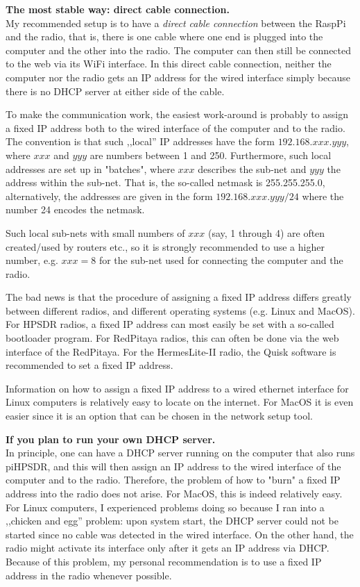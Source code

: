 \documentclass[12pt]{book}
\def\pH{pi\-HPSDR\xspace}
\begin{document}
\textbf{The most stable way: direct cable connection.}\\
My recommended setup is to have a \textit{direct cable connection} between the RaspPi and the radio, that
is, there is one cable where one end is plugged into the computer and the other into the radio. The computer
can then still be connected to the web via its WiFi interface. In this direct cable connection, neither
the computer nor the radio gets an IP address for the wired interface simply because there is no DHCP server
at either side of the cable.

To make the communication work, the easiest work-around is probably to assign a fixed IP address both to
the wired interface of the computer and to the radio. The convention is that such ,,local'' IP addresses have
the form $192.168.xxx.yyy$, where $xxx$ and $yyy$ are numbers between 1 and 250. Furthermore, such
local addresses are set up in "batches", where $xxx$ describes the sub-net and $yyy$ the address within the
sub-net. That is, the so-called netmask is 255.255.255.0, alternatively, the addresses are given in the
form $192.168.xxx.yyy/24$ where the number 24 encodes the netmask.

Such local sub-nets with small numbers of $xxx$ (say, 1 through 4) are often created/used by routers etc.,
so it is strongly recommended to use a higher number, e.g. $xxx=8$ for the sub-net used for connecting
the computer and the radio.

The bad news is that the procedure of assigning a fixed IP address differs greatly between different
radios, and different operating systems (e.g. Linux and MacOS). For HPSDR radios, a fixed IP address
can most easily be set with a so-called bootloader program. For RedPitaya radios, this can often
be done via the web interface of the RedPitaya. For the HermesLite-II radio, the Quisk software
is recommended to set a fixed IP address.

Information on how to assign a fixed IP address to a wired ethernet interface for Linux computers
is relatively easy to locate on the internet. For MacOS it is even easier since it is an option that
can be chosen in the network setup tool.

\textbf{If you plan to run your own DHCP server.}\\
In principle, one can have a DHCP server running on the computer that also runs \pH, and this
will then assign an IP address to the wired interface of the computer and to the
radio. Therefore, the problem of how to "burn" a fixed IP address into the radio does not arise. For MacOS, this
is indeed relatively easy. For Linux computers, I experienced problems doing so because I ran into a
,,chicken and egg'' problem: upon system start, the DHCP server could not be started since no cable was
detected in the wired interface. On the other hand, the radio might activate its interface only after
it gets an IP address via DHCP. Because of this problem, my personal recommendation is to use a fixed
IP address in the radio whenever possible.
\end{document}

